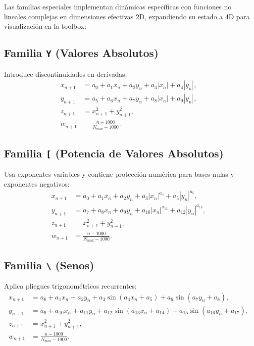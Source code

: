 \documentclass[11pt]{article}
\newcommand{\code}[1]{\texttt{#1}}
\begin{document}
Las familias especiales implementan dinámicas específicas con funciones no lineales complejas en dimensiones efectivas 2D, expandiendo su estado a 4D para visualización en la toolbox:

\subsection{Familia \code{Y} (Valores Absolutos)}
Introduce discontinuidades en derivadas:
\[
\begin{aligned}
x_{n+1} &= a_0 + a_1 x_n + a_2 y_n + a_3 |x_n| + a_4 |y_n|, \\
y_{n+1} &= a_5 + a_6 x_n + a_7 y_n + a_8 |x_n| + a_9 |y_n|, \\
z_{n+1} &= x_{n+1}^2 + y_{n+1}^2, \\
w_{n+1} &= \frac{n - 1000}{N_{\max} - 1000}.
\end{aligned}
\]

\subsection{Familia \code{[} (Potencia de Valores Absolutos)}
Usa exponentes variables y contiene protección numérica para bases nulas y exponentes negativos:
\[
\begin{aligned}
x_{n+1} &= a_0 + a_1 x_n + a_2 y_n + a_3 |x_n|^{a_4} + a_5 |y_n|^{a_6}, \\
y_{n+1} &= a_7 + a_8 x_n + a_9 y_n + a_{10} |x_n|^{a_{11}} + a_{12} |y_n|^{a_{13}}, \\
z_{n+1} &= x_{n+1}^2 + y_{n+1}^2, \\
w_{n+1} &= \frac{n - 1000}{N_{\max} - 1000}.
\end{aligned}
\]

\subsection{Familia \code{\textbackslash} (Senos)}
Aplica pliegues trigonométricos recurrentes:
\[
\begin{aligned}
x_{n+1} &= a_0 + a_1 x_n + a_2 y_n + a_3 \sin(a_4 x_n + a_5) + a_6 \sin(a_7 y_n + a_8), \\
y_{n+1} &= a_9 + a_{10} x_n + a_{11} y_n + a_{12} \sin(a_{13} x_n + a_{14}) + a_{15} \sin(a_{16} y_n + a_{17}), \\
z_{n+1} &= x_{n+1}^2 + y_{n+1}^2, \\
w_{n+1} &= \frac{n - 1000}{N_{\max} - 1000}.
\end{aligned}
\]
\end{document}
